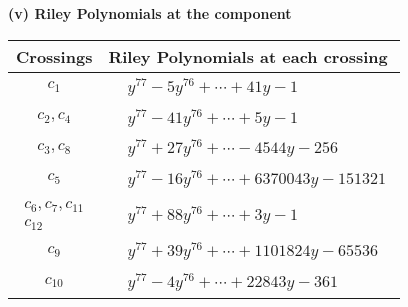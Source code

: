 \documentclass[1p]{elsarticle_modified}
\theoremstyle{definition}
\begin{document}
\newpage\renewcommand{\arraystretch}{1}
\flushleft \textbf{(v) Riley Polynomials at the component}\newline \\
\begin{tabular}{m{50pt}|m{274pt}}
Crossings & \hspace{64pt}Riley Polynomials at each crossing \\
\hline $$\begin{aligned}c_{1}\end{aligned}$$&$\begin{aligned}
&y^{77}-5 y^{76}+\cdots+41 y-1
\end{aligned}$\\
\hline $$\begin{aligned}c_{2},c_{4}\end{aligned}$$&$\begin{aligned}
&y^{77}-41 y^{76}+\cdots+5 y-1
\end{aligned}$\\
\hline $$\begin{aligned}c_{3},c_{8}\end{aligned}$$&$\begin{aligned}
&y^{77}+27 y^{76}+\cdots-4544 y-256
\end{aligned}$\\
\hline $$\begin{aligned}c_{5}\end{aligned}$$&$\begin{aligned}
&y^{77}-16 y^{76}+\cdots+6370043 y-151321
\end{aligned}$\\
\hline $$\begin{aligned}c_{6},c_{7},c_{11}\\c_{12}\end{aligned}$$&$\begin{aligned}
&y^{77}+88 y^{76}+\cdots+3 y-1
\end{aligned}$\\
\hline $$\begin{aligned}c_{9}\end{aligned}$$&$\begin{aligned}
&y^{77}+39 y^{76}+\cdots+1101824 y-65536
\end{aligned}$\\
\hline $$\begin{aligned}c_{10}\end{aligned}$$&$\begin{aligned}
&y^{77}-4 y^{76}+\cdots+22843 y-361
\end{aligned}$\\
\hline
\end{tabular}\\~\\
\end{document}
